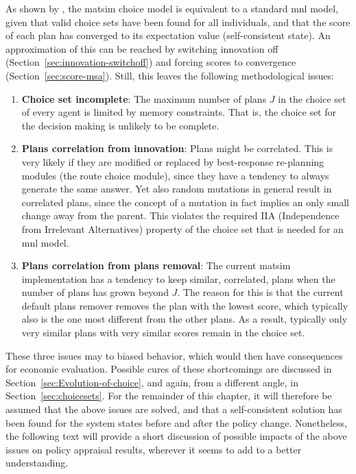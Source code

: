 As shown by \cite[][also see Chapter~\ref{ch:abta}]{NagelFloetteroed2009IatbrResourceInBook}, the \acrshort{matsim} choice model is equivalent to a standard \gls{mnl} model, given that valid choice sets have been found for all individuals, and that the score of each plan has converged to its expectation value (self-consistent state).
%
An approximation of this can be reached by switching innovation off (Section~\ref{sec:innovation-switchoff}) and forcing scores to convergence (Section~\ref{sec:score-msa}). 
Still, this leaves the following methodological issues:
%
\begin{enumerate}\styleEnumerate
%
\item \textbf{Choice set incomplete}: The maximum number of plans $J$ in the choice set of every agent is limited by memory constraints. That is, the choice set for the decision making is unlikely to be complete.
%
\item \textbf{Plans correlation from innovation}: Plans might be correlated. This is very likely if they are modified or replaced by best-response re-planning modules (\eg the route choice module), since they have a tendency to always generate the same answer. Yet also random mutations in general result in correlated plans, since the concept of a mutation in fact implies an only small change away from the parent.  This violates the required IIA (Independence from Irrelevant Alternatives) property of the choice set that is needed for an \gls{mnl} model.
%
\item \textbf{Plans correlation from plans removal}: The current \acrshort{matsim} implementation has a tendency to keep similar, \ie  correlated, plans when the number of plans has grown beyond $J$.  The reason for this is that the current default plans remover removes the plan with the lowest score, which typically also is the one most different from the other plans.  As a result, typically only very similar plans with very similar scores remain in the choice set.
%
\end{enumerate}
%
These three issues 
may to biased behavior, which would then have 
consequences for economic evaluation.  Possible cures of these shortcomings are discussed 
in Section~\ref{sec:Evolution-of-choice}, and again, from a different angle, in Section~\ref{sec:choicesets}. For the remainder of this chapter, it will therefore be assumed that the above issues are solved, and that a self-consistent solution has been found for the system states before and after the policy change.
%
Nonetheless, the following text will provide a short discussion of possible impacts of the above issues on policy appraisal results, wherever it seems to add to a better understanding.


